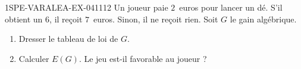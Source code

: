 \begin{exercice}{1SPE-VARALEA-EX-041}{1}{12}
Un joueur paie $2$~euros pour lancer un dé. S'il obtient un $6$, il reçoit $7$~euros. Sinon, il ne reçoit rien. Soit $G$ le gain algébrique.

\begin{enumerate}
  \item Dresser le tableau de loi de $G$.
  \item Calculer $E(G)$. Le jeu est-il favorable au joueur ?
\end{enumerate}
\end{exercice}
